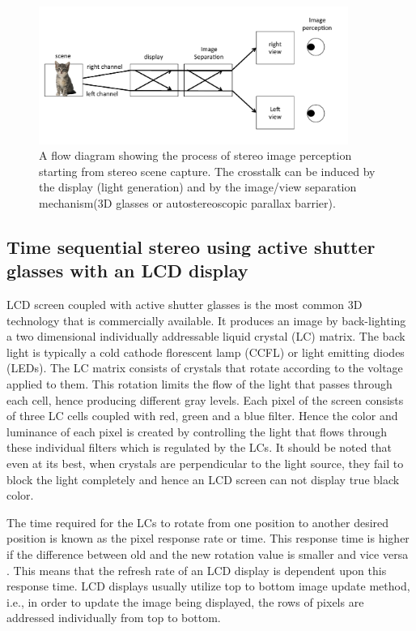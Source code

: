 \begin{figure}
\centering
    \includegraphics[width=0.9\textwidth]{./Template_Figures/ct_flow}
    \caption{A flow diagram showing the process of stereo image perception starting from stereo scene capture. The crosstalk can be induced by the display (light generation) and by the image/view separation mechanism(3D glasses or autostereoscopic parallax barrier).\label{fig:ctflow}}
\end{figure}

\subsection{Time sequential stereo using active shutter glasses with an LCD display}
LCD screen coupled with active shutter glasses is the most common 3D technology that is commercially available. It produces an image by back-lighting a two dimensional individually addressable liquid crystal (LC) matrix. The back light is typically a cold cathode florescent lamp (CCFL) or light emitting diodes (LEDs). The LC matrix consists of crystals that rotate according to the voltage applied to them. This rotation limits the flow of the light that passes through each cell, hence producing different gray levels. Each pixel of the screen consists of three LC cells coupled with red, green and a blue filter. Hence the color and luminance of each pixel is created by controlling the light that flows through these individual filters which is regulated by the LCs. It should be noted that even at its best, when crystals are perpendicular to the light source, they fail to block the light completely and hence an LCD screen can not display true black color.

The time required for the LCs to rotate from one position to another desired position is known as the pixel response rate or time. This response time is higher if the difference between old and the new rotation value is smaller and vice versa \cite{woods2012crosstalk}. This means that the refresh rate of an LCD display is dependent upon this response time. LCD displays usually utilize top to bottom image update method, i.e., in order to update the image being displayed, the rows of pixels are addressed individually from top to bottom.

